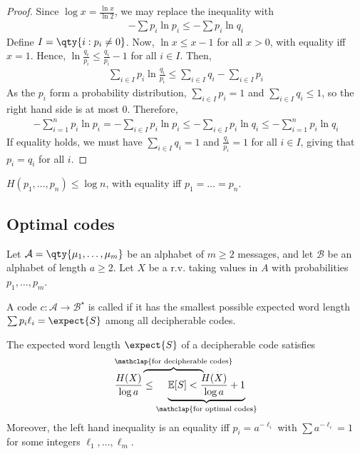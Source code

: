 \begin{proof}
    Since $\log x = \frac{\ln x}{\ln 2}$, we may replace the inequality with
    \begin{align*}
        -\sum p_i \ln p_i \leq -\sum p_i \ln q_i
    \end{align*}
    Define $I = \qty{i : p_i \neq 0}$.
    Now, $\ln x \leq x - 1$ for all $x > 0$, with equality iff $x = 1$.
    Hence, $\ln \frac{q_i}{p_i} \leq \frac{q_i}{p_i} - 1$ for all $i \in I$.
    Then,
    \begin{align*}
        \sum_{i \in I} p_i \ln \frac{q_i}{p_i} \leq \sum_{i \in I} q_i - \sum_{i \in I} p_i
    \end{align*}
    As the $p_i$ form a probability distribution, $\sum_{i \in I} p_i = 1$ and $\sum_{i \in I} q_i \leq 1$, so the right hand side is at most 0.
    Therefore,
    \begin{align*}
        -\sum_{i=1}^n p_i \ln p_i = -\sum_{i \in I} p_i \ln p_i \leq -\sum_{i \in I} p_i \ln q_i \leq -\sum_{i=1}^n p_i \ln q_i
    \end{align*}
    If equality holds, we must have $\sum_{i \in I} q_i = 1$ and $\frac{q_i}{p_i} = 1$ for all $i \in I$, giving that $p_i = q_i$ for all $i$.
\end{proof}

\begin{corollary}
    $H(p_1, \dots, p_n) \leq \log n$, with equality iff $p_1 = \dots = p_n$.
\end{corollary}

\subsection{Optimal codes}
Let $\mathcal A = \qty{\mu_1, \dots, \mu_m}$ be an alphabet of $m \geq 2$ messages, and let $\mathcal B$ be an alphabet of length $a \geq 2$.
Let $X$ be a r.v. taking values in $A$ with probabilities $p_1, \dots, p_m$.

\begin{definition}
    A code $c \colon \mathcal A \to \mathcal B^\star$ is called  if it has the smallest possible expected word length $\sum p_i \ell_i = \expect{S}$ among all decipherable codes.
\end{definition}

\begin{theorem}
    The expected word length $\expect{S}$ of a decipherable code satisfies
    \begin{align*}
        \rlap{\(\overbrace{\phantom{\frac{H(X)}{\log a} \leq \mathbb E[S]}}^{\mathclap{\text{for decipherable codes}}}\)} \frac{H(X)}{\log a} \leq \underbrace{\mathbb E[S] < \frac{H(X)}{\log a} + 1}_{\mathclap{\text{for optimal codes}}}
    \end{align*}
    Moreover, the left hand inequality is an equality iff $p_i = a^{-\ell_i}$ with $\sum a^{-\ell_i} = 1$ for some integers $\ell_1, \dots, \ell_m$.
\end{theorem}

